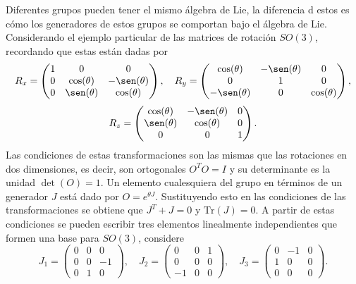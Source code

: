 Diferentes grupos pueden tener el mismo álgebra de Lie, la diferencia d estos es cómo los generadores de estos grupos se comportan bajo el álgebra de Lie.
Considerando el ejemplo particular de las matrices de rotación $SO(3)$, recordando que estas están dadas por
\begin{equation*}
  R_x = \begin{pmatrix}
    1 & 0            & 0             \\
    0 & \cos(\theta) & -\sen(\theta) \\
    0 & \sen(\theta) & \cos(\theta)
  \end{pmatrix}, \quad
  R_y = \begin{pmatrix}
    \cos(\theta)  & -\sen(\theta) & 0            \\
    0             & 1             & 0            \\
    -\sen(\theta) & 0             & \cos(\theta)
  \end{pmatrix},
\end{equation*}
\begin{equation*}
  R_z = \begin{pmatrix}
    \cos(\theta) & -\sen(\theta) & 0 \\
    \sen(\theta) & \cos(\theta)  & 0 \\
    0            & 0             & 1
  \end{pmatrix}.
\end{equation*}
Las condiciones de estas transformaciones son las mismas que las rotaciones en dos dimensiones, es decir, son ortogonales $O^T O = I$ y su determinante es la unidad $\det(O) = 1$. Un elemento cualesquiera del grupo en términos de un generador $J$ está dado por $O = e^{\theta J}$. Sustituyendo esto en las condiciones de las transformaciones se obtiene que $J^T + J = 0$ y $\mathrm{Tr}(J) = 0$. A partir de estas condiciones se pueden escribir tres elementos linealmente independientes que formen una base para $SO(3)$, considere
\begin{equation*}
  J_1 = \begin{pmatrix}
    0 & 0 & 0 \\ 0 & 0 & -1 \\ 0 & 1 & 0
  \end{pmatrix}, \quad
  J_2 = \begin{pmatrix}
    0 & 0 & 1 \\ 0 & 0 & 0 \\ -1 & 0 & 0
  \end{pmatrix}, \quad
  J_3 = \begin{pmatrix}
    0 & -1 & 0 \\ 1 & 0 & 0 \\ 0 & 0 & 0
  \end{pmatrix}.
\end{equation*}
